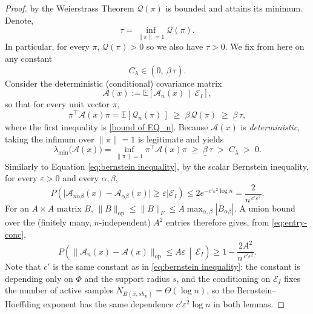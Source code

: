 \documentclass{article}
\begin{document}
\begin{proof}
by the Weierstrass Theorem $\mathcal{Q}(\pi)$ is bounded and attains its minimum.
Denote,
\begin{equation}
    \tau = \inf_{\|\pi\|=1} \mathcal{Q}(\pi).
    \label{pi*}
\end{equation}
In particular, for every $\pi$, $\mathcal{Q}(\pi)>0$ so we also have $\tau>0$. We fix from here on any constant
$$
C_\lambda \in \left(0,\ \underline{\beta}\,\tau\right).
$$
Consider the deterministic (conditional) covariance matrix
\begin{equation}
\mathscr{A}(x):=\mathbb{E}\!\left[\mathscr{A}_n(x)\,\middle|\,\mathscr{E}_I\right],
\end{equation}
so that for every unit vector $\pi$,
$$
\pi^\top\mathscr{A}(x)\pi=\mathbb{E}\!\left[\mathcal{Q}_n(\pi)\,\right]
\;\ge\;\underline{\beta}\,\mathcal{Q}(\pi)\;\ge\;\underline{\beta}\,\tau,
$$
where the first inequality is \eqref{bound of EQ_n}. Because $\mathscr{A}(x)$ is \emph{deterministic}, taking the infimum over $\|\pi\|=1$ is legitimate and yields
\begin{equation}
\lambda_{\min}\!\big(\mathscr{A}(x)\big)
=\inf_{\|\pi\|=1}\pi^\top\mathscr{A}(x)\pi
\;\ge\;\underline{\beta}\,\tau\;>\;C_\lambda\;>\;0 .
\label{eq:mean-pd}
\end{equation}
Similarly to Equation \eqref{eq:bernstein inequality}, by the scalar Bernstein inequality, for every $\varepsilon>0$ and every $\alpha,\beta$,
\begin{equation}
P\!\left(\big|\mathscr{A}_{n\alpha\beta}(x)-\mathscr{A}_{\alpha\beta}(x)\big|\ge\varepsilon
\Big|\mathscr{E}_I\right)\le 2e^{-c'\varepsilon^2\log n}=\frac{2}{n^{\,c'\varepsilon^2}}.
\label{eq:entry-conc}
\end{equation}
For an $A\times A$ matrix $B$, $\|B\|_{\mathrm{op}}\le\|B\|_F\le A\max_{\alpha,\beta}|B_{\alpha\beta}|$.
A union bound over the (finitely many, $n$-independent) $A^2$ entries therefore gives, from
\eqref{eq:entry-conc},
\begin{equation}
    P\!\left(\big\|\mathscr{A}_n(x)-\mathscr{A}(x)\big\|_{\mathrm{op}}\le A\varepsilon
\,\middle|\,\mathscr{E}_I\right)\ge 1-\frac{2A^2}{n^{\,c'\varepsilon^2}} .
\end{equation}
Note that $c'$ is the same constant as in \eqref{eq:bernstein inequality}: the constant is depending only on $\Phi$ and the support radius $s$, and the conditioning on $\mathscr{E}_I$ fixes the number of active samples $N_{B(\hat{x},sh_n)}=\Theta(\log n)$, so the Bernstein--Hoeffding exponent has the same dependence $c'\varepsilon^2\log n$ in both lemmas.


\end{proof}
\end{document}
